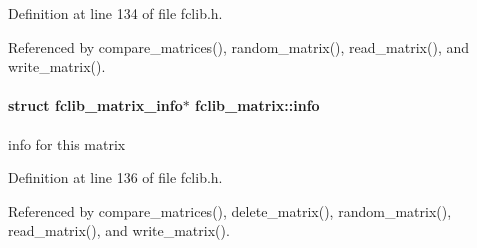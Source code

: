 Definition at line 134 of file fclib.\-h.



Referenced by compare\-\_\-matrices(), random\-\_\-matrix(), read\-\_\-matrix(), and write\-\_\-matrix().

\hypertarget{structfclib__matrix_ac0af227334c5b0a13a3222c8f04add36}{
\paragraph[{info}]{\setlength{\rightskip}{0pt plus 5cm}struct {\bf fclib\-\_\-matrix\-\_\-info}$\ast$ fclib\-\_\-matrix\-::info}}\label{structfclib__matrix_ac0af227334c5b0a13a3222c8f04add36}


info for this matrix 



Definition at line 136 of file fclib.\-h.



Referenced by compare\-\_\-matrices(), delete\-\_\-matrix(), random\-\_\-matrix(), read\-\_\-matrix(), and write\-\_\-matrix().

